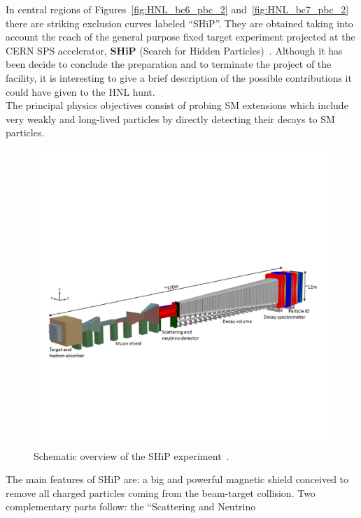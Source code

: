 
In central regions of Figures~\ref{fig:HNL_bc6_pbc_2}
and~\ref{fig:HNL_bc7_pbc_2} there are striking exclusion curves
labeled ``SHiP''. They are obtained taking into account the reach of
the general purpose fixed target experiment projected at the CERN SPS
accelerator, \textbf{SHiP} (Search for Hidden Particles)~\cite{bonivento2013proposal,
  shipcollaboration2015facility}. Although it has been decide to
conclude the preparation and to terminate the project of the facility,
it is interesting to give a brief description of the possible
contributions it could have given to the HNL hunt.\\
The principal physics objectives consist of probing SM extensions
which include very weakly and long-lived particles by directly
detecting their decays to SM particles.
\begin{figure}[h!]
\centering
    \includegraphics[clip,trim=0.3cm 5cm 1.cm 7cm, width=.75\textwidth]{Figures/c7/ship.pdf}
\caption{Schematic overview of the SHiP experiment~\cite{CERN-SHiP-NOTE-2018-001}.
}
\label{fig:ship1}
\end{figure}
The main features of SHiP are: a big and powerful 
magnetic shield conceived to remove all charged particles
coming from the beam-target collision. Two complementary
parts follow: the ``Scattering and Neutrino
